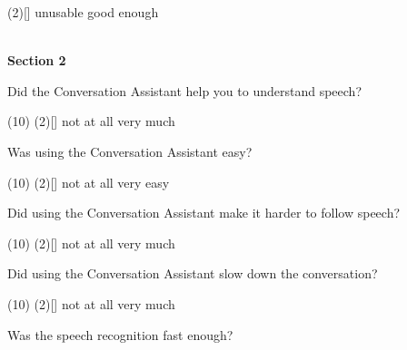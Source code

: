 \documentclass[english, 12pt, a4paper, pdftex, elec, utf8]{aaltothesis}
\begin{document}
{\begin{questionnaire}[resume]
\begin{tasks}[]
            \task*(2)[] unusable
            \task[] good enough \\\\
        \end{tasks}
    \end{questionnaire}
    \noindent
    \hspace{0.35cm}
    \textbf{Section 2}  
    \vspace{0.15cm} 
    \begin{questionnaire}[resume]
        \item Did the Conversation Assistant help you to understand speech?
        \begin{tasks}[](10)
            \task*(2)[] not at all
            \task[] very much
        \end{tasks}
        \item Was using the Conversation Assistant easy?
        \begin{tasks}[](10)
            \task*(2)[] not at all
            \task[] very easy
        \end{tasks}
        \item Did using the Conversation Assistant make it harder to follow speech?
        \begin{tasks}[](10)
            \task*(2)[] not at all
            \task[] very much
        \end{tasks}
        \item Did using the Conversation Assistant slow down the conversation?
        \begin{tasks}[](10)
            \task*(2)[] not at all
            \task[] very much
        \end{tasks}
        \item Was the speech recognition fast enough?

\end{questionnaire}}
\end{document}
